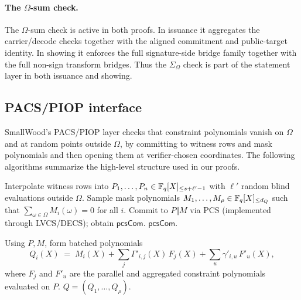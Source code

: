 \paragraph{The \(\Omega\)-sum check.}
The \(\Omega\)-sum check is active in both proofs. In issuance it aggregates the
carrier/decode checks together with the aligned commitment and public-target
identity. In showing it enforces the full signature-side bridge family together
with the full non-sign transform bridges. Thus the \(\Sigma_\Omega\) check is
part of the statement layer in both issuance and showing.

\subsection{PACS/PIOP interface}
SmallWood's PACS/PIOP layer checks that constraint polynomials vanish on
\(\Omega\) and at random points outside \(\Omega\), by committing to witness
rows and mask polynomials and then opening them at verifier-chosen
coordinates. The following algorithms summarize the high-level structure used in
our proofs.

\begin{algorithm}[H]
\caption{\textsf{PACS.PIOPCommitOracle}\(_{\mathrm{Prover}}(\textsf{params})\to \textsf{pcsCom}\)}
\label{alg:pacs-commitoracle}
\begin{algorithmic}[1]
\State Interpolate witness rows into \(P_1,\ldots,P_n\in\mathbb{F}_q[X]_{\le s+\ell'-1}\) with \(\ell'\) random blind evaluations outside \(\Omega\).
\State Sample mask polynomials \(M_1,\ldots,M_\rho\in\mathbb{F}_q[X]_{\le d_Q}\) such that \(\sum_{\omega\in\Omega} M_i(\omega)=0\) for all \(i\).
\State Commit to \(P\Vert M\) via PCS (implemented through LVCS/DECS); obtain \(\textsf{pcsCom}\).
\State \Return \(\textsf{pcsCom}\).
\end{algorithmic}
\end{algorithm}

\begin{algorithm}[H]
\caption{\textsf{PACS.PIOPBatchCombine}\(_{\mathrm{Prover}}(\textsf{pcsCom},\Gamma')\to Q\)}
\label{alg:pacs-batchcombine}
\begin{algorithmic}[1]
\State Using \(P,M\), form batched polynomials
\[
Q_i(X) \;=\; M_i(X) + \sum_j \Gamma'_{i,j}(X)\,F_j(X) + \sum_u \gamma'_{i,u}\,F'_u(X),
\]
where \(F_j\) and \(F'_u\) are the parallel and aggregated constraint polynomials evaluated on \(P\).
\State \Return \(Q=(Q_1,\ldots,Q_\rho)\).
\end{algorithmic}
\end{algorithm}

